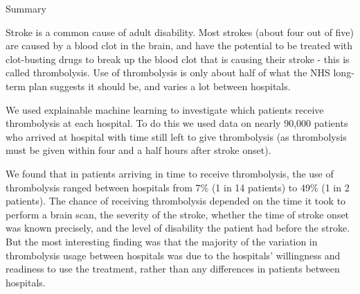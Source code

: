 \documentclass{beamer}
\begin{document}
\begin{frame}{Summary}

\begin{footnotesize}
    


Stroke is a common cause of adult disability. Most strokes (about four out of five) are caused by a blood clot in the brain, and have the potential to be treated with clot-busting drugs to break up the blood clot that is causing their stroke - this is called thrombolysis. Use of thrombolysis is only about half of what the NHS long-term plan suggests it should be, and varies a lot between hospitals.

\vspace{3mm}

We used explainable machine learning to investigate which patients receive thrombolysis at each hospital. To do this we used data on nearly 90,000 patients who arrived at hospital with time still left to give thrombolysis (as thrombolysis must be given within four and a half hours after stroke onset).

\vspace{3mm}

We found that in patients arriving in time to receive thrombolysis, the use of thrombolysis ranged between hospitals from 7\% (1 in 14 patients) to 49\% (1 in 2 patients). The chance of receiving thrombolysis depended on the time it took to perform a brain scan, the severity of the stroke, whether the time of stroke onset was known precisely, and the level of disability the patient had before the stroke. But the most interesting finding was that the majority of the variation in thrombolysis usage between hospitals was due to the hospitals’ willingness and readiness to use the treatment, rather than any differences in patients between hospitals.

\end{footnotesize}

\end{frame}
\end{document}
